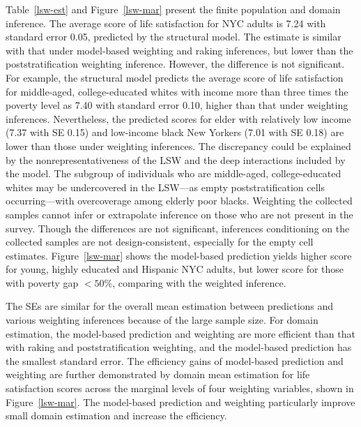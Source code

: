\documentclass[11pt]{article}
\numberwithin{figure}{section}
\numberwithin{table}{section}
\numberwithin{equation}{section}
\begin{document}
Table~\ref{lsw-est} and Figure~\ref{lsw-mar} present the finite population and
  domain inference. The average score of life satisfaction for NYC adults is
  7.24 with standard error 0.05, predicted by the structural model. The
  estimate is similar with that under model-based weighting and raking
  inferences, but lower than the poststratification weighting inference.
  However, the difference is not significant. For example, the structural model
  predicts the average score of life satisfaction for middle-aged,
  college-educated whites with income more than three times the poverty level
  as 7.40 with standard error 0.10, higher than that under weighting
  inferences. Nevertheless, the predicted scores for elder with relatively low
  income (7.37 with SE 0.15) and low-income black New Yorkers (7.01 with SE
  0.18) are lower than those under weighting inferences. The discrepancy could
  be explained by the nonrepresentativeness of the LSW and the deep
  interactions included by the model. The subgroup of individuals who are
  middle-aged, college-educated whites may be undercovered in the LSW---as
  empty poststratification cells occurring---with overcoverage among elderly
  poor blacks. Weighting the collected samples cannot infer or extrapolate
  inference on those who are not present in the survey. Though the differences
  are not significant, inferences conditioning on the collected samples are not
  design-consistent, especially for the empty cell estimates.
  Figure~\ref{lsw-mar} shows the model-based prediction yields higher score for
  young, highly educated and Hispanic NYC adults, but lower score for those
  with poverty gap $<50\%$, comparing with the weighted inference.

The SEs are similar for the overall mean estimation between predictions and
  various weighting inferences because of the large sample size. For domain
  estimation, the model-based prediction and weighting are more efficient than
  that with raking and poststratification weighting, and the model-based
  prediction has the smallest standard error. The efficiency gains of
  model-based prediction and weighting are further demonstrated by domain mean
  estimation for life satisfaction scores across the marginal levels of four
  weighting variables, shown in Figure~\ref{lsw-mar}. The model-based
  prediction and weighting particularly improve small domain estimation and
  increase the efficiency. 
\end{document}
